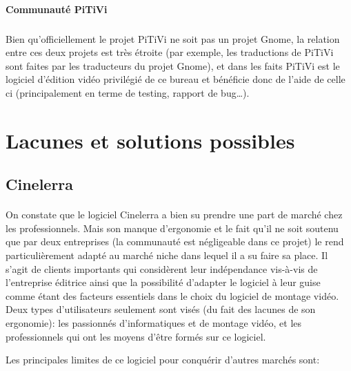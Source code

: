 \paragraph{Communauté PiTiVi}

\subparagraph{}

Bien qu'officiellement le projet PiTiVi ne soit pas un projet Gnome,
la relation entre ces deux projets est très étroite (par exemple, les
traductions de PiTiVi sont faites par les traducteurs du projet Gnome),
et dans les faits PiTiVi est le logiciel d'édition vidéo privilégié
de ce bureau et bénéficie donc de l'aide de celle ci (principalement
en terme de testing, rapport de bug\ldots).

\newpage \section{Lacunes et solutions possibles}

\subsection {Cinelerra}

\paragraph{}

On constate que le logiciel Cinelerra a bien su prendre une part de
marché chez les professionnels. Mais son manque d'ergonomie et le
fait qu'il ne soit soutenu que par deux entreprises (la communauté est
négligeable dans ce projet) le rend particulièrement adapté au marché
niche dans lequel il a su faire sa place. Il s'agit de clients importants
qui considèrent leur indépendance vis-à-vis de l'entreprise éditrice
ainsi que la possibilité d'adapter le logiciel à leur guise comme étant
des facteurs essentiels dans le choix du logiciel de montage vidéo. Deux
types d'utilisateurs seulement sont visés (du fait des lacunes de
son ergonomie): les passionnés d'informatiques et de montage vidéo,
et les professionnels qui ont les moyens d'être formés sur ce logiciel.

Les principales limites de ce logiciel pour conquérir d'autres marchés
sont:

